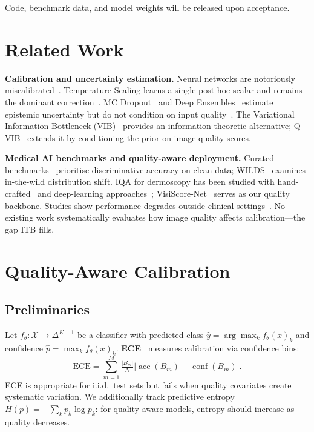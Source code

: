 \documentclass{bmvc2k}
\begin{document}
Code, benchmark data, and model weights will be released upon acceptance.

\section{Related Work}

\textbf{Calibration and uncertainty estimation.}
Neural networks are notoriously miscalibrated~\cite{guo2017calibration}.
Temperature Scaling learns a single post-hoc scalar and remains the dominant
correction~\cite{guo2017calibration}. MC Dropout~\cite{gal2016dropout} and
Deep Ensembles~\cite{lakshminarayanan2017ensemble} estimate epistemic
uncertainty but do not condition on input quality~\cite{malinin2019predictive}.
The Variational Information Bottleneck (VIB)~\cite{alemi2017vib} provides an
information-theoretic alternative; Q-VIB~\cite{anonymous2025qvib} extends it
by conditioning the prior on image quality scores.

\textbf{Medical AI benchmarks and quality-aware deployment.}
Curated benchmarks~\cite{irvin2019chexpert,codella2018skin} prioritise
discriminative accuracy on clean data; WILDS~\cite{koh2021wilds} examines
in-the-wild distribution shift. IQA for dermoscopy has been studied with
hand-crafted~\cite{barata2023quality} and deep-learning
approaches~\cite{park2023quality}; VisiScore-Net~\cite{anonymous2025visiscore}
serves as our quality backbone. Studies show performance degrades outside
clinical settings~\cite{winkler2022dermoscopy,liu2020deep}. No existing work
systematically evaluates how image quality affects calibration---the gap ITB
fills.

\section{Quality-Aware Calibration}
\label{sec:qac}

\subsection{Preliminaries}

Let $f_\theta: \mathcal{X} \to \Delta^{K-1}$ be a classifier with predicted
class $\hat{y} = \arg\max_k f_\theta(x)_k$ and confidence
$\hat{p} = \max_k f_\theta(x)_k$. \textbf{ECE}~\cite{guo2017calibration}
measures calibration via confidence bins:
\begin{equation}
\text{ECE} = \sum_{m=1}^{M} \tfrac{|B_m|}{N}
  \big|\operatorname{acc}(B_m) - \operatorname{conf}(B_m)\big|.
\label{eq:ece}
\end{equation}
ECE is appropriate for i.i.d.\ test sets but fails when quality covariates
create systematic variation. We additionally track predictive entropy
$H(p){=}{-}\sum_k p_k \log p_k$: for quality-aware models, entropy should
increase as quality decreases.
\end{document}
